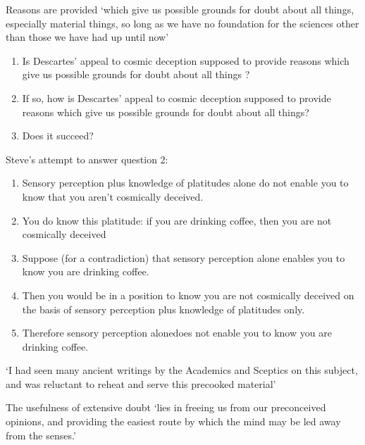 \documentclass[12pt]{extarticle}
\begin{document}
\begin{multicols*}{3}
Reasons are provided ‘which give us possible grounds for doubt about all things, especially material things,  
so long as we have no foundation for the sciences other than those we have had up until now’
 
\begin{enumerate}
\item Is Descartes’ appeal to cosmic deception supposed to provide reasons which give us possible grounds for doubt about all things ?
\item If so, how is Descartes’ appeal to cosmic deception supposed to provide  reasons which give us possible grounds for doubt about all things?
\item Does it succeed?
\end{enumerate}
 
Steve’s attempt to answer question 2:
\begin{enumerate}
\item Sensory perception plus knowledge of platitudes alone do not enable you to know that you aren’t cosmically deceived.
\item You do know this platitude: if you are drinking coffee, then you are not cosmically deceived
\item Suppose (for a contradiction) that sensory perception alone enables you to know you are drinking coffee.
\item Then you would be in a position to know you are not cosmically deceived on the basis of sensory perception plus knowledge of platitudes only.
\item Therefore sensory perception alonedoes not enable you to know you are drinking coffee.
\end{enumerate}
 
‘I had seen many ancient writings by the Academics and Sceptics on this subject, 
and was reluctant to reheat and serve this precooked material’
\citep[p.~94, AT VII:130]{descartes:1985_csm2}
 
The usefulness of extensive doubt ‘lies in freeing us from our preconceived opinions, 
and providing the easiest route by which the mind may be led away from the senses.’
 

    









\footnotesize


\end{multicols*}
\end{document}
